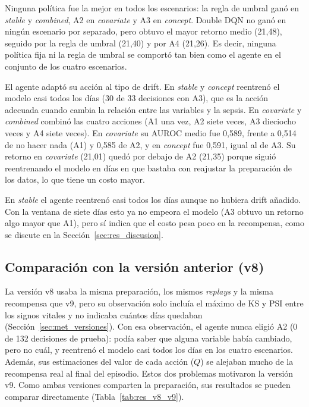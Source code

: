 Ninguna política fue la mejor en todos los escenarios: la regla de umbral ganó en
\textit{stable} y \textit{combined}, A2 en \textit{covariate} y A3 en \textit{concept}. Double DQN
no ganó en ningún escenario por separado, pero obtuvo el mayor retorno medio (21,48), seguido por
la regla de umbral (21,40) y por A4 (21,26). Es decir, ninguna política fija ni la regla de umbral
se comportó tan bien como el agente en el conjunto de los cuatro escenarios.

El agente adaptó su acción al tipo de drift. En \textit{stable} y \textit{concept} reentrenó el
modelo casi todos los días (30 de 33 decisiones con A3), que es la acción adecuada cuando cambia
la relación entre las variables y la sepsis. En \textit{covariate} y \textit{combined} combinó
las cuatro acciones (A1 una vez, A2 siete veces, A3 dieciocho veces y A4 siete veces). En
\textit{covariate} su AUROC medio fue 0,589, frente a 0,514 de no hacer nada (A1) y 0,585 de A2,
y en \textit{concept} fue 0,591, igual al de A3. Su retorno en \textit{covariate} (21,01) quedó
por debajo de A2 (21,35) porque siguió reentrenando el modelo en días en que bastaba con reajustar
la preparación de los datos, lo que tiene un costo mayor.

En \textit{stable} el agente reentrenó casi todos los días aunque no hubiera drift añadido. Con
la ventana de siete días esto ya no empeora el modelo (A3 obtuvo un retorno algo mayor que A1),
pero sí indica que el costo pesa poco en la recompensa, como se discute en la
Sección~\ref{sec:res_discusion}.

\subsection{Comparación con la versión anterior (v8)}

La versión v8 usaba la misma preparación, los mismos \textit{replays} y la misma recompensa que
v9, pero su observación solo incluía el máximo de KS y PSI entre los signos vitales y no indicaba
cuántos días quedaban (Sección~\ref{sec:met_versiones}). Con esa observación, el agente nunca
eligió A2 (0 de 132 decisiones de prueba): podía saber que alguna variable había cambiado, pero no
cuál, y reentrenó el modelo casi todos los días en los cuatro escenarios. Además, sus estimaciones
del valor de cada acción ($Q$) se alejaban mucho de la recompensa real al final del episodio. Estos
dos problemas motivaron la versión v9. Como ambas versiones comparten la preparación, sus
resultados se pueden comparar directamente (Tabla~\ref{tab:res_v8_v9}).

